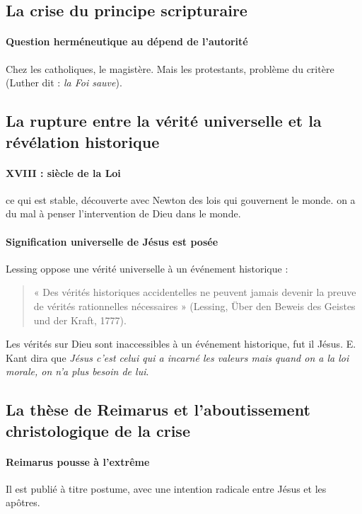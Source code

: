 \subsection{La crise du principe scripturaire}  
\paragraph{Question herméneutique au dépend de l'autorité} Chez les catholiques, le magistère.  Mais les protestants, problème du critère (Luther dit : \textit{la Foi sauve}). 

\subsection{La rupture entre la vérité universelle et la révélation historique}  
\paragraph{XVIII : siècle de la Loi} ce qui est stable, découverte avec Newton des lois qui gouvernent le monde. on a du mal à penser l'intervention de Dieu dans le monde. 

\paragraph{Signification universelle de Jésus est posée} Lessing oppose une vérité universelle à un événement historique : 

\begin{quote}
   « Des vérités historiques accidentelles ne peuvent jamais devenir la preuve de vérités rationnelles nécessaires » (Lessing, Über den Beweis des Geistes und der Kraft, 1777). 
\end{quote}

Les vérités sur Dieu sont inaccessibles à un événement historique, fut il Jésus. E. Kant dira que \textit{Jésus c'est celui qui a incarné les valeurs mais quand on a la loi morale, on n'a plus besoin de lui}.

\subsection{La thèse de Reimarus et l’aboutissement christologique de la crise} 

\paragraph{Reimarus pousse à l'extrême} Il est publié à titre postume, avec une intention radicale entre Jésus et les apôtres. 

